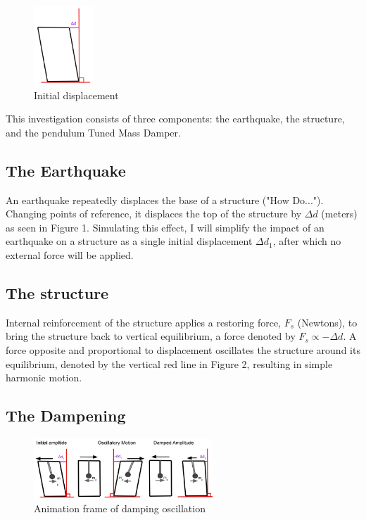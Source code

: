 \documentclass[11pt]{article}
\begin{document}
\begin{figure}
\vspace{-15pt}
\centering
\includegraphics[width=0.2\textwidth]{img/fig1.jpg}
\caption{\label{fig:1}Initial displacement}
\vspace{-50pt}
\end{figure}

This investigation consists of three components: the earthquake, the structure, and the pendulum Tuned Mass Damper.

\subsection{The Earthquake}

An earthquake repeatedly displaces the base of a structure ("How Do..."). Changing points of reference, it displaces the top of the structure by $\Delta d$ (meters) as seen in Figure 1. Simulating this effect, I will simplify the impact of an earthquake on a structure as a single initial displacement $\Delta d_1$, after which no external force will be applied.


\subsection{The structure}

Internal reinforcement of the structure applies a restoring force, $F_s$ (Newtons), to bring the structure back to vertical equilibrium, a force denoted by $F_s \propto -\Delta d$. A force opposite and proportional to displacement oscillates the structure around its equilibrium, denoted by the vertical red line in Figure 2, resulting in simple harmonic motion.



\subsection{The Dampening}

\begin{figure}
\centering
\includegraphics[width=0.6\textwidth]{img/fig2.jpg}
\caption{\label{fig:2}Animation frame of damping oscillation}
\vspace{-10pt}
\end{figure}
\end{document}
